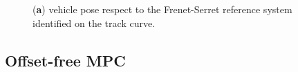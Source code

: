 \documentclass[conference]{IEEEtran} %
\renewcommand{\vec}[1]{\boldsymbol{#1}}
\DeclarePairedDelimiter{\norm}{\lVert}{\rVert}
\begin{document}
%

\begin{figure}[htb] \centering
	\caption{(\textbf{a}) vehicle pose respect to the Frenet-Serret reference system identified on the track curve.}
	\label{fig:scheme_frenet_serret}
\end{figure}

\subsection{Offset-free MPC}
\end{document}
